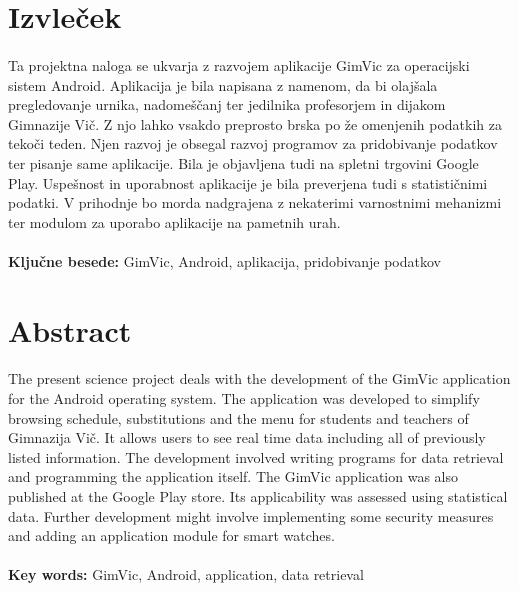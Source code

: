 \section*{Izvleček}
\paragraph{}Ta projektna naloga se ukvarja z razvojem aplikacije GimVic za operacijski sistem Android. Aplikacija je bila napisana z namenom, da bi olajšala pregledovanje urnika, nadomeščanj ter jedilnika profesorjem in dijakom Gimnazije Vič. Z njo lahko vsakdo preprosto brska po že omenjenih podatkih za tekoči teden. Njen razvoj je obsegal razvoj programov za pridobivanje podatkov ter pisanje same aplikacije. Bila je objavljena tudi na spletni trgovini Google Play. Uspešnost in uporabnost aplikacije je bila preverjena tudi s statističnimi podatki. V prihodnje bo morda nadgrajena z nekaterimi varnostnimi mehanizmi ter modulom za uporabo aplikacije na pametnih urah.

\paragraph{}\textbf{Ključne besede:} GimVic, Android, aplikacija, pridobivanje podatkov


\section*{Abstract}
\paragraph{}The present science project deals with the development of the GimVic application for the Android operating system. The application was developed to simplify browsing schedule, substitutions and the menu for students and teachers of Gimnazija Vič. It allows users to see real time data including all of previously listed information. The development involved writing programs for data retrieval and programming the application itself. The GimVic application was also published at the Google Play store. Its applicability was assessed using statistical data. Further development might involve implementing some security measures and adding an application module for smart watches.

\paragraph{}\textbf{Key words:} GimVic, Android, application, data retrieval

